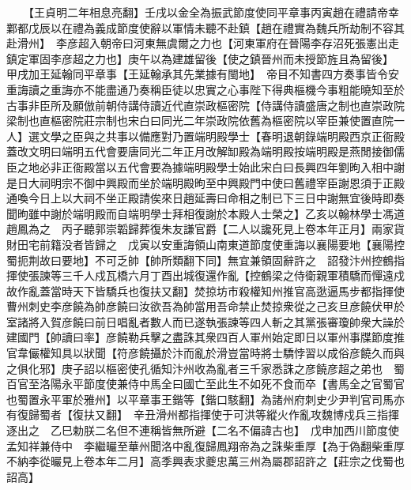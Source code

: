 　　【王貞明二年相息亮翻】壬戌以金全為振武節度使同平章事丙寅趙在禮請帝幸鄴都戊辰以在禮為義成節度使辭以軍情未聽不赴鎮【趙在禮實為魏兵所劫制不容其赴滑州】　李彦超入朝帝曰河東無虞爾之力也【河東軍府在晉陽李存沼死張憲出走鎮定軍固李彦超之力也】庚午以為建雄留後【使之鎮晉州而未授節旌且為留後】　甲戌加王延翰同平章事【王延翰承其先業據有閩地】　帝目不知書四方奏事皆令安重誨讀之重誨亦不能盡通乃奏稱臣徒以忠實之心事陛下得典樞機今事粗能曉知至於古事非臣所及願倣前朝侍講侍讀近代直崇政樞密院【侍講侍讀盛唐之制也直崇政院梁制也直樞密院莊宗制也宋白曰同光二年崇政院依舊為樞密院以宰臣兼使置直院一人】選文學之臣與之共事以備應對乃置端明殿學士【春明退朝錄端明殿西京正衙殿蓋改文明曰端明五代會要唐同光二年正月改解缷殿為端明殿按端明殿是燕閒接御儒臣之地必非正衙殿當以五代會要為據端明殿學士始此宋白曰長興四年劉昫入相中謝是日大祠明宗不御中興殿而坐於端明殿昫至中興殿門中使曰舊禮宰臣謝恩須于正殿通喚今日上以大祠不坐正殿請俟來日趙延壽曰命相之制已下三日中謝無宜後時即奏聞昫雖中謝於端明殿而自端明學士拜相復謝於本殿人士榮之】乙亥以翰林學士馮道趙鳳為之　丙子聽郭崇韜歸葬復朱友謙官爵【二人以讒死見上卷本年正月】兩家貨財田宅前籍没者皆歸之　戊寅以安重誨領山南東道節度使重誨以襄陽要地【襄陽控蜀扼荆故曰要地】不可乏帥【帥所類翻下同】無宜兼領固辭許之　詔發汴州控鶴指揮使張諫等三千人戍瓦橋六月丁酉出城復還作亂【控鶴梁之侍衛親軍積驕而憚遠戍故作亂蓋當時天下皆驕兵也復扶又翻】焚掠坊市殺權知州推官高逖逼馬步都指揮使曹州刺史李彦饒為帥彦饒曰汝欲吾為帥當用吾命禁止焚掠衆從之己亥旦彦饒伏甲於室諸將入賀彦饒曰前日唱亂者數人而已遂執張諫等四人斬之其黨張審瓊帥衆大譟於建國門【帥讀曰率】彦饒勒兵擊之盡誅其衆四百人軍州始定即日以軍州事牒節度推官韋儼權知具以狀聞【符彦饒攝於汴而亂於滑豈當時將士驕悖習以成俗彦饒久而與之俱化邪】庚子詔以樞密使孔循知汴州收為亂者三千家悉誅之彦饒彦超之弟也　蜀百官至洛陽永平節度使兼侍中馬全曰國亡至此生不如死不食而卒【書馬全之官蜀官也蜀置永平軍於雅州】以平章事王鍇等【鍇口駭翻】為諸州府刺史少尹判官司馬亦有復歸蜀者【復扶又翻】　辛丑滑州都指揮使于可洪等縱火作亂攻魏博戍兵三指揮逐出之　乙巳勅朕二名但不連稱皆無所避【二名不偏諱古也】　戊申加西川節度使孟知祥兼侍中　李繼曮至華州聞洛中亂復歸鳳翔帝為之誅柴重厚【為于偽翻柴重厚不納李從曮見上卷本年二月】高季興表求夔忠萬三州為屬郡詔許之【莊宗之伐蜀也詔高】

